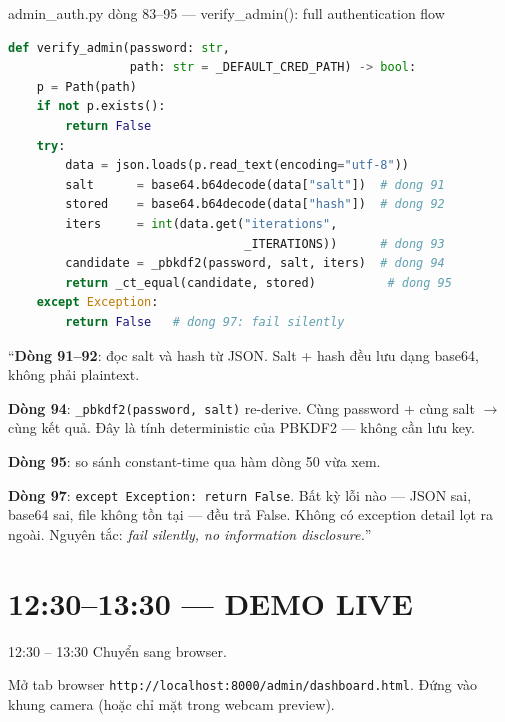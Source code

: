 \documentclass[12pt, a4paper]{article}
\begin{document}
\begin{code}{admin\_auth.py dòng 83--95 --- verify\_admin(): full authentication flow}
\begin{lstlisting}[language=Python, firstnumber=83]
def verify_admin(password: str,
                 path: str = _DEFAULT_CRED_PATH) -> bool:
    p = Path(path)
    if not p.exists():
        return False
    try:
        data = json.loads(p.read_text(encoding="utf-8"))
        salt      = base64.b64decode(data["salt"])  # dong 91
        stored    = base64.b64decode(data["hash"])  # dong 92
        iters     = int(data.get("iterations",
                                 _ITERATIONS))      # dong 93
        candidate = _pbkdf2(password, salt, iters)  # dong 94
        return _ct_equal(candidate, stored)          # dong 95
    except Exception:
        return False   # dong 97: fail silently
\end{lstlisting}
\end{code}

\begin{say}
``\textbf{Dòng 91--92}: đọc salt và hash từ JSON.
Salt + hash đều lưu dạng base64, không phải plaintext.

\textbf{Dòng 94}: \texttt{\_pbkdf2(password, salt)} re-derive.
Cùng password + cùng salt $\to$ cùng kết quả.
Đây là tính deterministic của PBKDF2 --- không cần lưu key.

\textbf{Dòng 95}: so sánh constant-time qua hàm dòng 50 vừa xem.

\textbf{Dòng 97}: \texttt{except Exception: return False}.
Bất kỳ lỗi nào --- JSON sai, base64 sai, file không tồn tại --- đều trả False.
Không có exception detail lọt ra ngoài.
Nguyên tắc: \textit{fail silently, no information disclosure.}''
\end{say}

\section{12:30--13:30 --- DEMO LIVE}

\begin{timing}{12:30 -- 13:30}
Chuyển sang browser.
\end{timing}

\begin{doact}
Mở tab browser \texttt{http://localhost:8000/admin/dashboard.html}.
Đứng vào khung camera (hoặc chỉ mặt trong webcam preview).
\end{doact}
\end{document}
